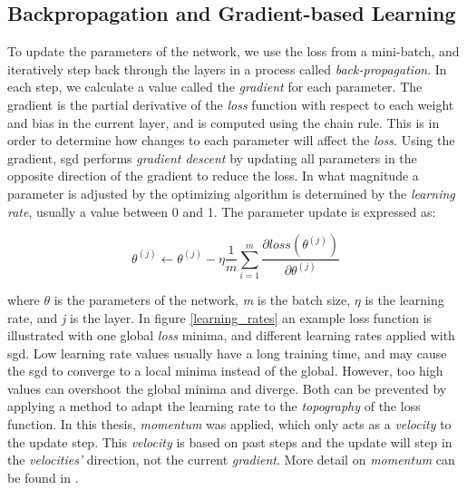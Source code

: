     
    
    
\subsection{Backpropagation and Gradient-based Learning}\label{backpropagation}
    To update the parameters of the network, we use the loss from a mini-batch, and iteratively step back through the layers in a process called \textit{back-propagation}\cite{rumelhart1986learning_backprop}. In each step, we calculate a value called the \textit{gradient} for each parameter. The gradient is the partial derivative of the \textit{loss} function with respect to each weight and bias in the current layer, and is computed using the chain rule. This is in order to determine how changes to each parameter will affect the \textit{loss}. Using the gradient, \gls{sgd} performs \textit{gradient descent}\cite{Goodfellow-et-al-2016_gradient_descent} by updating all parameters in the opposite direction of the gradient to reduce the loss. In what magnitude a parameter is adjusted by the optimizing algorithm is determined by the \textit{learning rate}, usually a value between 0 and 1. The parameter update is expressed as\cite{pmlr-v37-ioffe15_batch_norm}:
    
    \begin{equation}
    \theta^{(j)} \leftarrow \theta^{(j)} - \eta \dfrac{1}{m}\sum_{i=1}^{m} \dfrac{\partial loss (\theta^{(j)})}{\partial \theta^{(j)}}
    \end{equation}
    
    where $\theta$ is the parameters of the network, \textit{m} is the batch size, $\eta$ is the learning rate, and \textit{j} is the layer. In figure \ref{learning_rates} an example loss function is illustrated with one global \textit{loss} minima, and different learning rates applied with \gls{sgd}. Low learning rate values usually have a long training time, and may cause the \gls{sgd} to converge to a local minima instead of the global\cite{farsal2018deep}. However, too high values can overshoot the global minima and diverge. Both can be prevented by applying a method to adapt the learning rate to the \textit{topography} of the loss function. In this thesis, \textit{momentum} was applied, which only acts as a \textit{velocity} to the update step. This \textit{velocity} is based on past steps and the update will step in the \textit{velocities'} direction, not the current \textit{gradient}. More detail on \textit{momentum} can be found in \citeauthor{pmlr-v28-sutskever13}\cite{pmlr-v28-sutskever13}.
    
